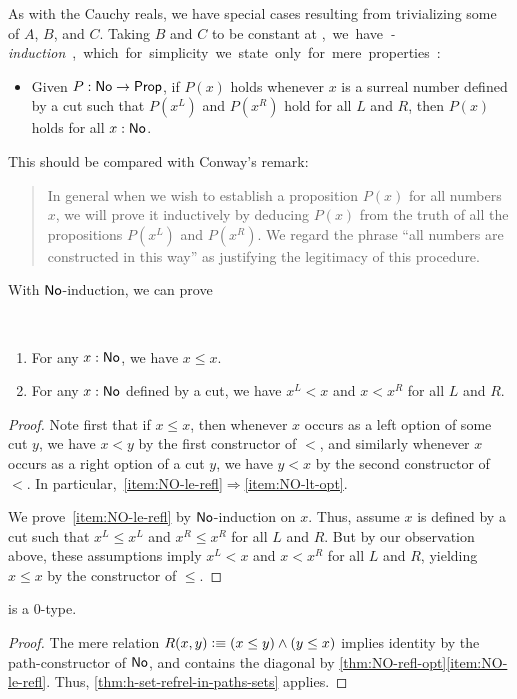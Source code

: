 As with the Cauchy reals, we have special cases resulting from trivializing some of $A$, $B$, and $C$.
Taking $B$ and $C$ to be constant at \unit, we have \emph{\NO-induction}, which for simplicity we state only for mere properties:
\begin{itemize}
\item Given $P:\mathsf{No}\to\mathsf{Prop}$, if $P(x)$ holds whenever $x$ is a surreal number defined by a cut such that $P(x^L)$ and $P(x^R)$ hold for all
$L$ and $R$, then $P(x)$ holds for all $x:\mathsf{No}$.
\end{itemize}
This should be compared with Conway's remark:
\begin{quote}\footnotesize
  In general when we wish to establish a proposition $P(x)$ for all numbers $x$, we will prove it inductively by deducing $P(x)$ from the truth of all the propositions $P(x^L)$ and $P(x^R)$.
  We regard the phrase ``all numbers are constructed in this way'' as justifying the legitimacy of this procedure.
\end{quote}
With $\mathsf{No}$-induction, we can prove

\begin{thm}\label{thm:NO-refl-opt}\ 
  \begin{enumerate}
  \item For any $x:\mathsf{No}$, we have $x\le x$.\label{item:NO-le-refl}
  \item For any $x:\mathsf{No}$ defined by a cut, we have $x^L <x$ and $x<x^R$ for all $L$ and $R$.\label{item:NO-lt-opt}
  \end{enumerate}
\end{thm}
\begin{proof}
  Note first that if $x\le x$, then whenever $x$ occurs as a left option of some cut $y$, we have $x<y$ by the first constructor of $<$, and similarly whenever $x$ occurs as a right option of a cut $y$, we have $y<x$ by the second constructor of $<$.
  In particular,~\ref{item:NO-le-refl}$\Rightarrow$\ref{item:NO-lt-opt}.

  We prove~\ref{item:NO-le-refl} by $\mathsf{No}$-induction on $x$.
  Thus, assume $x$ is defined by a cut such that $x^L\le x^L$ and $x^R \le x^R$ for all $L$ and $R$.
  But by our observation above, these assumptions imply $x^L<x$ and $x<x^R$ for all $L$ and $R$, yielding $x\le x$ by the constructor of $\le$.
\end{proof}

\begin{cor}\label{thm:NO-set}
  \NO is a 0-type.
\end{cor}
\begin{proof}
  The mere relation $R(x,y)\vcentcolon\equiv (x\le y) \land (y\le x)$ implies identity by the path-constructor of $\mathsf{No}$, and contains the diagonal by \autoref{thm:NO-refl-opt}\ref{item:NO-le-refl}.
  Thus, \autoref{thm:h-set-refrel-in-paths-sets} applies.
\end{proof}

